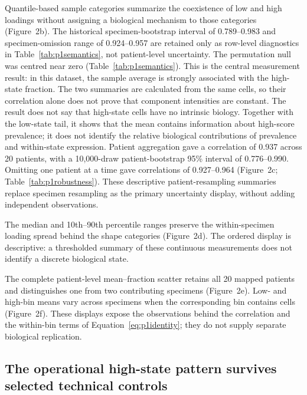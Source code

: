 \documentclass[10pt,a4paper]{article}
\begin{document}
Quantile-based sample categories summarize the coexistence of low and high loadings without assigning a biological mechanism to those categories (Figure~2b). The historical specimen-bootstrap interval of 0.789--0.983 and specimen-omission range of 0.924--0.957 are retained only as row-level diagnostics in Table~\ref{tab:p1semantics}, not patient-level uncertainty. The permutation null was centred near zero (Table~\ref{tab:p1semantics}). This is the central measurement result: in this dataset, the sample average is strongly associated with the high-state fraction. The two summaries are calculated from the same cells, so their correlation alone does not prove that component intensities are constant. The result does not say that high-state cells have no intrinsic biology. Together with the low-state tail, it shows that the mean contains information about high-score prevalence; it does not identify the relative biological contributions of prevalence and within-state expression. Patient aggregation gave a correlation of 0.937 across 20 patients, with a 10,000-draw patient-bootstrap 95\% interval of 0.776--0.990. Omitting one patient at a time gave correlations of 0.927--0.964 (Figure~2c; Table~\ref{tab:p1robustness}). These descriptive patient-resampling summaries replace specimen resampling as the primary uncertainty display, without adding independent observations.

The median and 10th--90th percentile ranges preserve the within-specimen loading spread behind the shape categories (Figure~2d). The ordered display is descriptive: a thresholded summary of these continuous measurements does not identify a discrete biological state.

The complete patient-level mean--fraction scatter retains all 20 mapped patients and distinguishes one from two contributing specimens (Figure~2e). Low- and high-bin means vary across specimens when the corresponding bin contains cells (Figure~2f). These displays expose the observations behind the correlation and the within-bin terms of Equation~\eqref{eq:p1identity}; they do not supply separate biological replication.

\subsection{The operational high-state pattern survives selected technical controls}
\end{document}

